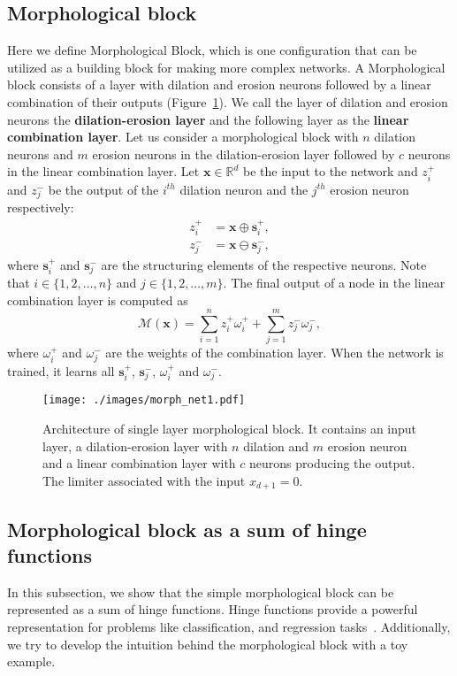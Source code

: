 \documentclass{bmvc2k}
\newcommand{\newterm}[1]{{\bf #1}}
\def\Figref#1{Figure~\ref{#1}}
\def\vs{{\bm{s}}}
\def\vx{{\bm{x}}}
\newcommand{\R}{\mathbb{R}}
\begin{document}
\subsection{Morphological block}
\label{sec:SL_morph}
Here we define Morphological Block, which is one configuration that can be utilized as a building block for making more complex networks. A Morphological block consists of a layer with dilation and erosion neurons followed by a linear combination of their outputs (\Figref{fig:single_layer_network}). We call the layer of dilation and erosion neurons the \newterm{dilation-erosion layer} and the following layer as the \newterm{linear combination layer}. 
Let us consider a morphological block with $n$ dilation neurons and $m$ erosion neurons in the dilation-erosion layer followed by $c$ neurons in the linear combination layer. Let $\vx \in \R^d$ be the input to the network and $z_{i}^+$ and $z_{j}^-$ be the output of the $i^{th}$ dilation neuron and the $j^{th}$ erosion neuron respectively: 
\begin{align}
    z_{i}^+ &= \vx \oplus \vs_i^+ , \\ z_{j}^- &= \vx \ominus \vs_j^-  \label{eq:erosion_net},
\end{align}
where $\vs_i^+$ and $\vs_j^-$ are the structuring elements of the respective neurons. Note that $i \in \{1, 2, \ldots, n\}$ and $j \in \{1, 2, \ldots, m\}$. The final output of a node in the linear combination layer is computed as 
\begin{equation}
    \mathcal{M}(\vx)=\sum_{i=1}^{n} z_{i}^+\omega_i^{+}+\sum_{j=1}^{m} z_{j}^- \omega_j^{-},
    \label{eq:total}
\end{equation}
where $\omega_i^{+}$ and $\omega_j^{-}$ are the weights of the combination layer. When the network is trained, it learns all $\vs_i^+$, $\vs_j^-$, $\omega_i^{+}$ and $\omega_j^{-}$. 

\begin{figure}
    \centering
    \texttt{[image: ./images/morph\_net1.pdf]}   
    \caption{Architecture of single layer morphological block. It contains an input layer, a dilation-erosion layer with $n$ dilation and $m$ erosion neuron and a linear combination layer with $c$ neurons producing the output. The limiter associated with the input $x_{d+1}=0$.}
    \label{fig:single_layer_network}
\end{figure}

\subsection{Morphological block as a sum of hinge functions}
In this subsection, we show that the simple morphological block can be represented as a sum of hinge functions. 
Hinge functions provide a powerful representation for problems like classification, and regression tasks~\cite{breiman1993hinging}. 
Additionally, we try to develop the intuition behind the morphological block with a toy example. 
\end{document}
